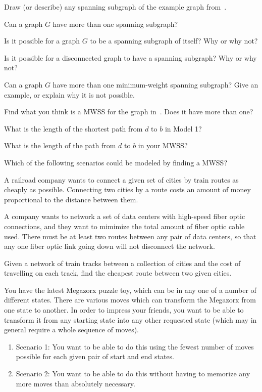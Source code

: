 \documentclass{tufte-handout}
\begin{document}
\begin{questions}
\item \label{q:draw-ss} Draw (or describe) any spanning subgraph of the example
  graph from~.
\item Can a graph $G$ have more than one spanning subgraph?
\item Is it possible for a graph $G$ to be a spanning subgraph of
  itself?  Why or why not?
\item Is it possible for a disconnected graph to have a spanning
  subgraph?  Why or why not?
\item Can a graph $G$ have more than one minimum-weight spanning
  subgraph?  Give an example, or explain why it is not possible.
\item Find what you think is a MWSS for the graph in~. Does it have
  more than one?
\item What is the length of the shortest path from $d$ to $b$ in Model 1?
\item What is the length of the path from $d$ to $b$ in your MWSS?
\item \label{q:scenarios} Which of the following scenarios could be
  modeled by finding a MWSS?
  \begin{subquestions}
  \item A railroad company wants to connect a given set of cities by
    train routes as cheaply as possible. Connecting two cities by a
    route costs an amount of money proportional to the distance
    between them.
  \item A company wants to network a set of data centers with
    high-speed fiber optic connections, and they want to mimimize the
    total amount of fiber optic cable used. There must be at least two
    routes between any pair of data centers, so that any one fiber
    optic link going down will not disconnect the network.
  \item Given a network of train tracks between a collection of cities
    and the cost of travelling on each track, find the cheapest route
    between two given cities.
  \item You have the latest Megazorx puzzle toy, which can be in any
    one of a number of different states.  There are various moves
    which can transform the Megazorx from one state to another.  In
    order to impress your friends, you want to be able to transform it
    from any starting state into any other requested state (which may
    in general require a whole sequence of moves).
    \begin{enumerate}[label=(\roman*)]
    \item Scenario 1: You want to be able to do this using the fewest
      number of moves possible for each given pair of start and end
      states.
    \item Scenario 2: You want to be able to do this without having to
      memorize any more moves than absolutely necessary.
    \end{enumerate}
  \end{subquestions}


\end{questions}
\end{document}
